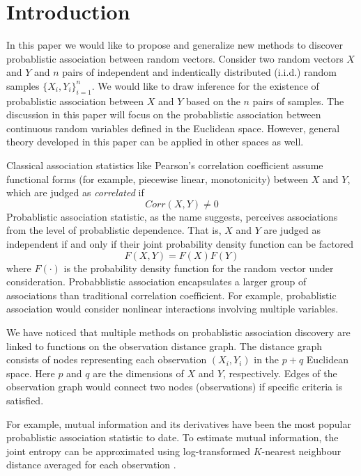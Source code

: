 \documentclass{sig-alternate}
\begin{document}


\section{Introduction}
\label{sec:intro}

In this paper we would like to propose and generalize new methods to
discover probablistic association between random vectors. Consider two
random vectors $X$ and $Y$ and $n$ pairs of independent and
indentically distributed (i.i.d.) random samples $\{X_i,
Y_i\}_{i=1}^n$. We would like to draw inference for the existence of
probablistic association between $X$ and $Y$ based on the $n$ pairs of
samples. The discussion in this paper will focus on the probablistic
association between continuous random variables defined in the
Euclidean space. However, general theory developed in this paper can
be applied in other spaces as well.

Classical association statistics like Pearson's correlation
coefficient assume functional forms (for example, piecewise linear,
monotonicity) between $X$ and $Y$, which are judged as
\emph{correlated} if
\begin{displaymath}
  Corr(X,Y) \ne 0
\end{displaymath}
Probablistic association statistic, as the name suggests, perceives
associations from the level of probablistic dependence. That is, $X$
and $Y$ are judged as independent if and only if their joint
probability density function can be factored
\begin{equation}
  \label{eq:independence}
  F(X,Y)= F(X) F(Y)
\end{equation}
where $F(\cdot)$ is the probability density function for the random
vector under consideration. Probabblistic association encapsulates a
larger group of associations than traditional correlation coefficient.
For example, probablistic association would consider nonlinear
interactions involving multiple variables.

We have noticed that multiple methods on probablistic association
discovery are linked to functions on the observation distance graph.
The distance graph consists of nodes representing each observation
$(X_i, Y_i)$ in the $p+q$ Euclidean space. Here $p$ and $q$ are the
dimensions of $X$ and $Y$, respectively. Edges of the observation
graph would connect two nodes (observations) if specific criteria is
satisfied.

For example, mutual information and its derivatives have been the most
popular probablistic association statistic to
date\cite{cite:my-cas-work, citation:MINE-science,
  tostevin2009mutual}. To estimate mutual information, the joint
entropy can be approximated using log-transformed $K$-nearest
neighbour distance averaged for each observation
\cite{PhysRevE.69.066138, leonenko2008,
  doi:10.1080/104852504200026815}.
\end{document}
